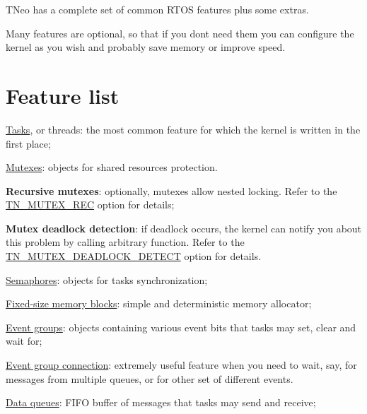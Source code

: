 T\+Neo has a complete set of common R\+T\+OS features plus some extras.

Many features are optional, so that if you don\textquotesingle{}t need them you can configure the kernel as you wish and probably save memory or improve speed.\hypertarget{features_feature_list}{}\section{Feature list}\label{features_feature_list}

\begin{DoxyItemize}
\item \hyperlink{tn__tasks_8h}{Tasks}, or threads\+: the most common feature for which the kernel is written in the first place;
\item \hyperlink{tn__mutex_8h}{Mutexes}\+: objects for shared resources protection.
\begin{DoxyItemize}
\item {\bfseries Recursive mutexes}\+: optionally, mutexes allow nested locking. Refer to the {\ttfamily \hyperlink{tn__cfg__default_8h_a2557da78508c4241aceee92475df3581}{T\+N\+\_\+\+M\+U\+T\+E\+X\+\_\+\+R\+EC}} option for details;
\item {\bfseries Mutex deadlock detection}\+: if deadlock occurs, the kernel can notify you about this problem by calling arbitrary function. Refer to the {\ttfamily \hyperlink{tn__cfg__default_8h_a6ed3ec7b0d4338e7f60dde86b7ea5fa4}{T\+N\+\_\+\+M\+U\+T\+E\+X\+\_\+\+D\+E\+A\+D\+L\+O\+C\+K\+\_\+\+D\+E\+T\+E\+CT}} option for details.
\end{DoxyItemize}
\item \hyperlink{tn__sem_8h}{Semaphores}\+: objects for tasks synchronization;
\item \hyperlink{tn__fmem_8h}{Fixed-\/size memory blocks}\+: simple and deterministic memory allocator;
\item \hyperlink{tn__eventgrp_8h}{Event groups}\+: objects containing various event bits that tasks may set, clear and wait for;
\begin{DoxyItemize}
\item \hyperlink{tn__eventgrp_8h_eventgrp_connect}{Event group connection}\+: extremely useful feature when you need to wait, say, for messages from multiple queues, or for other set of different events.
\end{DoxyItemize}
\item \hyperlink{tn__dqueue_8h}{Data queues}\+: F\+I\+FO buffer of messages that tasks may send and receive;

\end{DoxyItemize}
